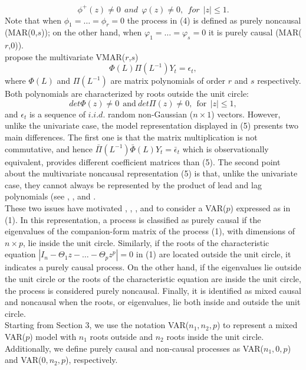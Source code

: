 \documentclass[<1p>]{elsarticle} %
\begin{document}
\begin{equation*}
	\phi^+(z) \neq 0 \ \ and \ \ \varphi(z) \neq 0, \ \ for\ \  |z|  \leq 1.
\end{equation*}
Note that when $\phi_{1} = \dots = \phi_{r}=0$ the 
process in (4) is defined as purely noncausal 
(MAR(0,$s$)); on the other hand, 
when $\varphi_{1} = \dots = \varphi_{s}=0$ it is purely
causal (MAR($r$,0)).\\
\indent \cite{lanne2013noncausal} propose the multivariate  VMAR($r$,$s$)
\begin{equation}
\Phi (L) \Pi(L^{-1})Y_{t}=\epsilon_{t},
\end{equation}
where $\Phi (L)$ and $\Pi (L^{-1})$ are matrix 
polynomials of order $r$ and $s$ respectively. 
Both polynomials are characterized by roots 
outside the unit circle:
\begin{equation}
det \Phi(z) \neq 0\ \ \text{and}\ det \Pi(z) \neq 0,\ \ \text{for}\ \ |z| \leq 1,
\end{equation}
and $\epsilon_{t}$ is a sequence of $i.i.d.$ random 
non-Gaussian ($n \times 1$) vectors. However, unlike 
the univariate case, the model representation 
displayed in (5) presents two main differences. The first 
one is that the matrix multiplication is not 
commutative, and hence $\bar{\Pi} (L^{-1}) \bar{\Phi}(L)Y_{t}=\bar{\epsilon}_{t}$ which is observationally equivalent, provides different coefficient matrices than (5). The second point about the multivariate noncausal representation (5) is that, unlike the univariate case, they cannot always be represented by the product of lead and lag polynomials (see \cite{lanne2013noncausal}, \cite{davis2020noncausal}, and \cite{gourieroux2017noncausal}. \\
\indent These two issues have motivated
\cite{davis2020noncausal}, 
\cite{gourieroux2017noncausal}, 
\cite{gourieroux2022generalized}, and 
\cite{gourieroux2022nonlinear} to consider a VAR($p$) expressed as in (1). In this representation, a process is classified as purely causal if the eigenvalues of the companion-form matrix of the process (1), with dimensions of $n \times p$, lie inside the unit circle. Similarly, if the roots of the characteristic equation $|I_n -\Theta_1 z - \dots - \Theta_p z^p|=0$ in (1) are located outside the unit circle, it indicates a purely causal process. On the other hand, if the eigenvalues lie outside the unit circle or the roots of the characteristic equation are inside the unit circle, the process is considered purely noncausal. Finally, it is identified as mixed causal and noncausal when the roots, or eigenvalues, lie both inside and outside the unit circle.\\
\indent Starting from Section 3, we use the notation VAR($n_1,n_2,p$) to represent a mixed VAR($p$) model with $n_1$ roots outside and $n_2$ roots inside the unit circle. Additionally, we define purely causal and non-causal processes as VAR($n_1,0,p$) and VAR($0,n_2,p$), respectively.
\end{document}
